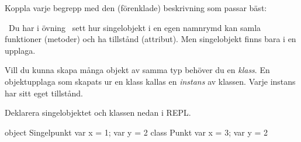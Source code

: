 

\ifPreSolution

\Exercise{\ExeWeekFIVE}\label{exe:W05}

\begin{Goals}

\end{Goals}

\begin{Preparations}
\item {}
\end{Preparations}

\else


\ExerciseSolution{\ExeWeekFIVE}


\fi


\BasicTasks %



\QUESTBEGIN

\Task \what

\vspace{1em}\noindent Koppla varje begrepp med den (förenklade) beskrivning som passar bäst:

\begin{ConceptConnections}

\end{ConceptConnections}

\SOLUTION

\TaskSolved \what

\begin{ConceptConnections}

\end{ConceptConnections}

\QUESTEND



\QUESTBEGIN

\Task \what~Du har i övning \texttt{\ExeWeekFOUR}~sett hur singelobjekt i en egen namnrymd  kan samla funktioner (metoder) och ha tillstånd (attribut). Men singelobjekt finns bara i en upplaga.

Vill du kunna skapa många objekt av samma typ behöver du en \emph{klass}. En objektupplaga som skapats ur en klass kallas en \emph{instans} av klassen. Varje instans har sitt eget tillstånd.

Deklarera singelobjektet och klassen nedan i REPL.

\begin{Code}
object Singelpunkt { var x = 1; var y = 2 }
class  Punkt       { var x = 3; var y = 2 }
\end{Code}

